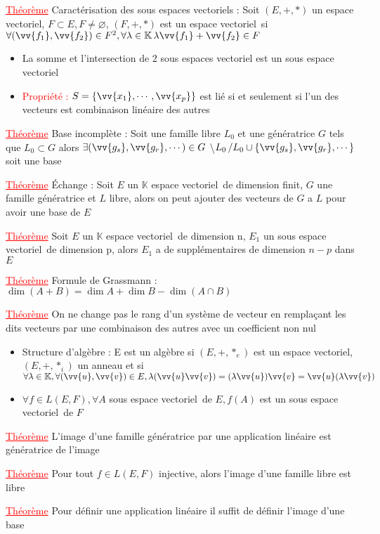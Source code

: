 \documentclass[a4paper, french]{article}
\newcommand{\K}{\mathbb{K}}
\newcommand{\ev}{espace vectoriel}
\newcommand{\la}{\lambda}
\newcommand{\thm}{\textcolor{red}{\underline{Théorème} }}
\newcommand{\ppt}{\textcolor{red}{Propriété : }}
\newcommand{\acc}[1]{\left\{ #1 \right\}}
\begin{document}
	\thm Caractérisation des sous espaces vectoriels : Soit $(E,+,*)$ un \ev, $F \subset E, F \neq \varnothing$, $(F,+,*)$ est un \ev \, si $\forall(\vv{f_1},\vv{f_2}) \in F^2, \forall \la \in \K \, \la \vv{f_1}+\vv{f_2} \in F$
	
	\begin{itemize}[label=\(\bullet\)]
	  \item La somme et l'intersection de 2 sous espaces vectoriel est un sous espace vectoriel
	  \item \ppt $S=\acc{\vv{x_1},\cdots,\vv{x_p}}$ est lié si et seulement si l'un des vecteurs est combinaison linéaire des autres
	\end{itemize}
	
	 \thm Base incomplète : Soit une famille libre $L_0$ et une génératrice $G$ tels que $L_0 \subset G$ alors $\exists (\vv{g_s},\vv{g_r},\cdots) \in G$ \textbackslash $L_0 \, /  L_0 \cup \acc{\vv{g_s},\vv{g_r},\cdots}$ soit une base 
	 
	 \thm Échange : Soit $E$ un $\K$ \ev \, de dimension finit, $G$ une famille génératrice et $L$ libre, alors on peut ajouter des vecteurs de $G$ a $L$ pour avoir une base de $E$ 
	 
	 \thm Soit $E$ un $\K$ \ev \, de dimension n, $E_1$ un sous \ev \, de dimension p, alors $E_1$ a de supplémentaires de dimension $n-p$ dans $E$
	 
	 \thm Formule de Grassmann : $\dim(A+B)=\dim A + \dim B - \dim(A\cap B)$ 
	 
	 \thm On ne change pas le rang d'un système de vecteur en remplaçant les dits vecteurs par une combinaison des autres avec un coefficient non nul
	
	 \begin{itemize}[label=\(\bullet\)]
	  \item Structure d'algèbre : E est un algèbre si $(E,+,*_e)$ est un \ev, $(E,+,*_i)$ un anneau et si $\forall \la \in \K,\forall (\vv{u},\vv{v}) \in E, \la(\vv{u}\vv{v})=(\la\vv{u})\vv{v}=\vv{u}(\la \vv{v})$
	  \item $\forall f \in L(E,F), \forall A$ sous \ev \, de $E, f(A)$ est un sous \ev \, de $F$ 
	\end{itemize}

	 \thm L'image d'une famille génératrice par une application linéaire est génératrice de l'image 
	 
	 \thm Pour tout $f \in L(E,F)$ injective, alors l'image d'une famille libre est libre 
	 
	 \thm Pour définir une application linéaire il suffit de définir l'image d'une base 
	 
\end{document}
